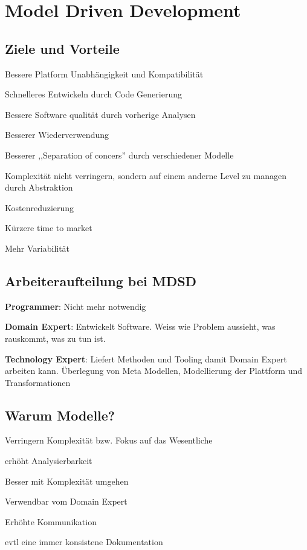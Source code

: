 
\chapter{Model Driven Development}

\section{Ziele und Vorteile}
\begin{compactitem}
    \item Bessere Platform Unabhängigkeit und Kompatibilität
    \item Schnelleres Entwickeln durch Code Generierung
    \item Bessere Software qualität durch vorherige Analysen
    \item Besserer Wiederverwendung
    \item Besserer ,,Separation of concers'' durch verschiedener Modelle
    \item Komplexität nicht verringern, sondern auf einem anderne Level zu
    managen durch Abstraktion
\end{compactitem}
\begin{compactitem}
    \item Kostenreduzierung
    \item Kürzere time to market
    \item Mehr Variabilität
\end{compactitem}

\section{Arbeiteraufteilung bei MDSD}
\begin{compactitem}
    \item \textbf{Programmer}: Nicht mehr notwendig
    \item \textbf{Domain Expert}: Entwickelt Software. Weiss wie Problem aussieht,
    was rauskommt, was zu tun ist.
    \item \textbf{Technology Expert}: Liefert Methoden und Tooling damit Domain
    Expert arbeiten kann. Überlegung von Meta Modellen, Modellierung der Plattform
    und Transformationen
\end{compactitem}

\section{Warum Modelle?}
\begin{compactitem}
    \item Verringern Komplexität bzw. Fokus auf das Wesentliche
    \item erhöht Analysierbarkeit
    \item Besser mit Komplexität umgehen
    \item Verwendbar vom Domain Expert
    \item Erhöhte Kommunikation
    \item evtl eine immer konsistene Dokumentation
\end{compactitem}

